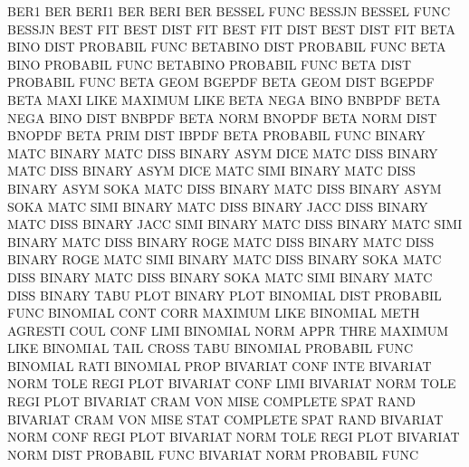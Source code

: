 BER1                                    BER
BERI1                                   BER
BERI                                    BER
BESSEL   FUNC                           BESSJN
BESSEL   FUNC                           BESSJN
BEST     FIT                            BEST     DIST FIT
BEST     FIT  DIST                      BEST     DIST FIT
BETA     BINO DIST                      PROBABIL FUNC
BETABINO DIST                           PROBABIL FUNC
BETA     BINO                           PROBABIL FUNC
BETABINO                                PROBABIL FUNC
BETA     DIST                           PROBABIL FUNC
BETA     GEOM                           BGEPDF
BETA     GEOM DIST                      BGEPDF
BETA     MAXI LIKE                      MAXIMUM  LIKE
BETA     NEGA BINO                      BNBPDF
BETA     NEGA BINO DIST                 BNBPDF
BETA     NORM                           BNOPDF
BETA     NORM DIST                      BNOPDF
BETA     PRIM DIST                      IBPDF
BETA                                    PROBABIL FUNC
BINARY   MATC                           BINARY   MATC DISS
BINARY   ASYM DICE MATC DISS            BINARY   MATC DISS
BINARY   ASYM DICE MATC SIMI            BINARY   MATC DISS
BINARY   ASYM SOKA MATC DISS            BINARY   MATC DISS
BINARY   ASYM SOKA MATC SIMI            BINARY   MATC DISS
BINARY   JACC DISS                      BINARY   MATC DISS
BINARY   JACC SIMI                      BINARY   MATC DISS
BINARY   MATC SIMI                      BINARY   MATC DISS
BINARY   ROGE MATC DISS                 BINARY   MATC DISS
BINARY   ROGE MATC SIMI                 BINARY   MATC DISS
BINARY   SOKA MATC DISS                 BINARY   MATC DISS
BINARY   SOKA MATC SIMI                 BINARY   MATC DISS
BINARY   TABU PLOT                      BINARY   PLOT
BINOMIAL DIST                           PROBABIL FUNC
BINOMIAL CONT CORR                      MAXIMUM  LIKE
BINOMIAL METH                           AGRESTI  COUL CONF LIMI
BINOMIAL NORM APPR THRE                 MAXIMUM  LIKE
BINOMIAL TAIL                           CROSS    TABU
BINOMIAL                                PROBABIL FUNC
BINOMIAL RATI                           BINOMIAL PROP
BIVARIAT CONF INTE                      BIVARIAT NORM TOLE REGI PLOT
BIVARIAT CONF LIMI                      BIVARIAT NORM TOLE REGI PLOT
BIVARIAT CRAM VON  MISE                 COMPLETE SPAT RAND
BIVARIAT CRAM VON  MISE STAT            COMPLETE SPAT RAND
BIVARIAT NORM CONF REGI PLOT            BIVARIAT NORM TOLE REGI PLOT
BIVARIAT NORM DIST                      PROBABIL FUNC
BIVARIAT NORM                           PROBABIL FUNC
